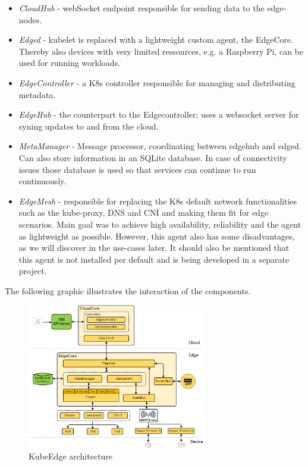 \documentclass[MSC,Master,english]{twbook}%
\begin{document}
\begin{itemize}
    \item \textit{CloudHub} - webSocket endpoint responsible for sending data to the edge-nodes.
    \item \textit{Edged} - kubelet is replaced with a lightweight custom agent, the EdgeCore. Thereby also devices with very limited ressources, e.g. a Raspberry Pi, can be used for running workloads.
    \item \textit{EdgeController} - a \ac{K8s} controller responsible for managing and distributing metadata.
    \item \textit{EdgeHub} - the counterpart to the Edgecontroller; uses a websocket server for syning updates to and from the cloud.
    \item \textit{MetaManager} - Message processor, coordinating between edgehub and edged. Can also store information in an SQLite database. In case of connectivity issues those database is used so that services can continue to run continuously.
    \item \textit{EdgeMesh} - responsible for replacing the \ac{K8s} default network functionalities such as the kube-proxy, \ac{DNS} and \ac{CNI} and making them fit for edge scenarios. Main goal was to achieve high availability, reliability and the agent as lightweight as possible. However, this agent also has some disadvantages, as we will discover in the use-cases later. It should also be mentioned that this agent is not installed per default and is being developed in a separate project.
\end{itemize}

The following graphic illustrates the interaction of the components. 
\begin{figure}[ht]
    \centering
    \includegraphics[width=0.70\textwidth]{PICs/kubeedge-arch.png}
    \caption{KubeEdge architecture\cite{ke-docs-why}}
    \label{fig:ke-architecture}
\end{figure}
\end{document}
